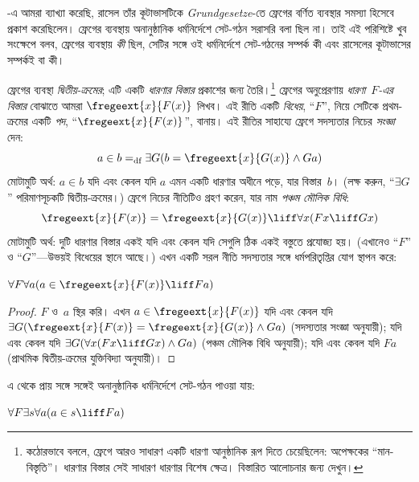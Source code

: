 \documentclass[../../../include/open-logic-section]{subfiles}
\begin{document}


-এ আমরা ব্যাখ্যা করেছি, রাসেল তাঁর কূটাভাসটিকে
\emph{Grundgesetze}-তে ফ্রেগের বর্ণিত ব্যবস্থার সমস্যা হিসেবে
প্রকাশ করেছিলেন। ফ্রেগের ব্যবস্থায় অনানুষ্ঠানিক ধর্মনির্দেশে
সেট-গঠন সরাসরি বলা ছিল না। তাই এই পরিশিষ্টে খুব সংক্ষেপে
বলব, ফ্রেগের ব্যবস্থায় \emph{কী} ছিল, সেটির সঙ্গে ওই
ধর্মনির্দেশে সেট-গঠনের সম্পর্ক কী এবং রাসেলের কূটাভাসের
সম্পর্কই বা কী।

ফ্রেগের ব্যবস্থা \emph{দ্বিতীয়-ক্রমের}; এটি একটি
\emph{ধারণার বিস্তার} প্রকাশের জন্য তৈরি।\footnote{কঠোরভাবে
বললে, ফ্রেগে আরও সাধারণ একটি ধারণা আনুষ্ঠানিক রূপ দিতে
চেয়েছিলেন: অপেক্ষকের ``মান-বিস্তৃতি''। ধারণার বিস্তার
সেই সাধারণ ধারণার বিশেষ ক্ষেত্র। বিস্তারিত আলোচনার জন্য
\citet[pp.\ 8--9]{Heck2012} দেখুন।} ফ্রেগের অনুপ্রেরণায়
\emph{ধারণা~$F$-এর বিস্তার} বোঝাতে আমরা
$\fregeext{x}{F(x)}$ লিখব। এই রীতি একটি \emph{বিধেয়},
``$F$'', নিয়ে সেটিকে প্রথম-ক্রমের একটি \emph{পদ},
``$\fregeext{x}{F(x)}$'', বানায়। এই রীতির সাহায্যে
ফ্রেগে সদস্যতার নিচের \emph{সংজ্ঞা} দেন:
\[
  a \in b =_\text{df} \exists G(b = \fregeext{x}{G(x)} \land Ga)
\]
মোটামুটি অর্থ: $a \in b$ যদি এবং কেবল যদি $a$ এমন
একটি ধারণার অধীনে পড়ে, যার বিস্তার~$b$। (লক্ষ করুন,
``$\exists G$'' পরিমাণসূচকটি দ্বিতীয়-ক্রমের।) ফ্রেগে
নিচের নীতিটিও গ্রহণ করেন, যার নাম \emph{পঞ্চম মৌলিক বিধি}:
$$\fregeext{x}{F(x)} = \fregeext{x}{G(x)} \liff \forall x (Fx \liff Gx)$$
মোটামুটি অর্থ: দুটি ধারণার বিস্তার একই যদি এবং কেবল যদি
সেগুলি ঠিক একই বস্তুতে প্রযোজ্য হয়। (এখানেও ``$F$'' ও
``$G$''—উভয়ই বিধেয়ের স্থানে আছে।) এখন একটি সরল নীতি
সদস্যতার সঙ্গে ধর্মপরিতৃপ্তির যোগ স্থাপন করে:

\begin{lem}
$\forall F \forall a(a \in \fregeext{x}{F(x)} \liff Fa)$
\end{lem}

\begin{proof}
$F$ ও~$a$ স্থির করি। এখন $a \in \fregeext{x}{F(x)}$
যদি এবং কেবল যদি $\exists G(\fregeext{x}{F(x)}
= \fregeext{x}{G(x)} \land Ga)$ (সদস্যতার সংজ্ঞা অনুযায়ী);
যদি এবং কেবল যদি $\exists G(\forall x(Fx \liff Gx) \land Ga)$
(পঞ্চম মৌলিক বিধি অনুযায়ী); যদি এবং কেবল যদি $Fa$
(প্রাথমিক দ্বিতীয়-ক্রমের যুক্তিবিদ্যা অনুযায়ী)।
\end{proof}

এ থেকে প্রায় সঙ্গে সঙ্গেই অনানুষ্ঠানিক ধর্মনির্দেশে
সেট-গঠন পাওয়া যায়:

\begin{lem}
$\forall F \exists s \forall a (a \in s \liff Fa)$
\end{lem}
\end{document}
